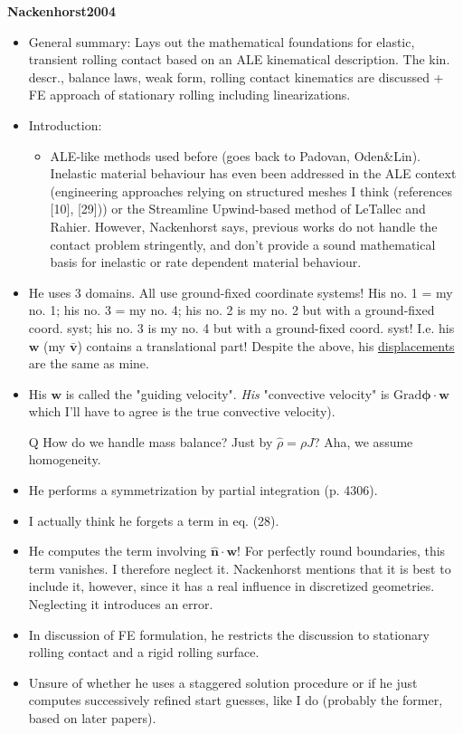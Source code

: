 \documentclass{article}
\begin{document}
\textbf{Nackenhorst2004}
\begin{itemize}
\item General summary: Lays out the mathematical foundations for elastic, transient rolling contact based on an ALE kinematical description. The kin. descr., balance laws, weak form, rolling contact kinematics are discussed + FE approach of stationary rolling including linearizations.
\item Introduction:
\begin{itemize}
\item ALE-like methods used before (goes back to Padovan, Oden\&Lin). Inelastic material behaviour has even been addressed in the ALE context (engineering approaches relying on structured meshes I think (references [10], [29])) or the Streamline Upwind-based method of LeTallec and Rahier. However, Nackenhorst says, previous works do not handle the contact problem stringently, and don't provide a sound mathematical basis for inelastic or rate dependent material behaviour.
\end{itemize}
\item He uses 3 domains. All use ground-fixed coordinate systems! His no. 1 = my no. 1; his no. 3 = my no. 4; his no. 2 is my no. 2 but with a ground-fixed coord. syst; his no. 3 is my no. 4 but with a ground-fixed coord. syst! I.e. his $\boldsymbol{w}$ (my $\boldsymbol{\bar{v}}$) contains a translational part! Despite the above, his \underline{displacements} are the same as mine.
\item His $\boldsymbol{w}$ is called the "guiding velocity". \emph{His} "convective velocity" is $\mathrm{Grad}\boldsymbol{\phi}\cdot\boldsymbol{w}$ which I'll have to agree is the true convective velocity).
\item[Q] How do we handle mass balance? Just by $\hat{\rho} = \rho J$? Aha, we assume homogeneity.
\item He performs a symmetrization by partial integration (p. 4306).
\item I actually think he forgets a term in eq. (28).
\item He computes the term involving $\boldsymbol{\hat{n}}\cdot\boldsymbol{w}$! For perfectly round boundaries, this term vanishes. I therefore neglect it. Nackenhorst mentions that it is best to include it, however, since it has a real influence in discretized geometries. Neglecting it introduces an error.
\item In discussion of FE formulation, he restricts the discussion to stationary rolling contact and a rigid rolling surface.
\item Unsure of whether he uses a staggered solution procedure or if he just computes successively refined start guesses, like I do (probably the former, based on later papers).
\end{itemize}
\end{document}
